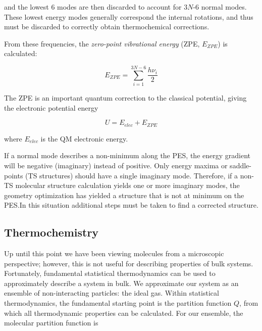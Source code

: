\noindent and the lowest 6 modes are then discarded to account for 3$N$-6
normal modes. These lowest energy modes generally correspond the internal
rotations, and thus must be discarded to correctly obtain thermochemical
corrections.

From these frequencies, the \emph{zero-point vibrational energy} (ZPE,
$E_{ZPE}$) is calculated:

\begin{equation}
  E_{ZPE} = \sum_{i=1}^{3N-6} \frac{h\nu_i}{2}
\end{equation}

\noindent The ZPE is an important quantum correction to the classical
potential, giving the electronic potential energy

\begin{equation}
U = E_{elec} + E_{ZPE}
\end{equation}

\noindent where $E_{elec}$ is the QM electronic energy.

If a normal mode describes a non-minimum along the PES, the energy gradient
will be negative (imaginary) instead of positive. Only energy maxima or
saddle-points (TS structures) should have a single imaginary mode. Therefore,
if a non-TS molecular structure calculation yields one or more imaginary modes,
the geometry optimization has yielded a structure that is not at minimum on
the PES.\@ In this situation additional steps must be taken to find a corrected
structure.

\subsection{Thermochemistry}

Up until this point we have been viewing molecules from a microscopic
perspective; however, this is not useful for describing properties of bulk
systems. Fortunately, fundamental statistical thermodynamics can be used to
approximately describe a system in bulk.\cite{McQuarrie1999,McQuarrie2000} We
approximate our system as an ensemble of non-interacting particles: the ideal
gas. Within statistical thermodynamics, the fundamental starting point is the
partition function $Q$, from which all thermodynamic
properties can be calculated. For our ensemble, the molecular partition
function is

